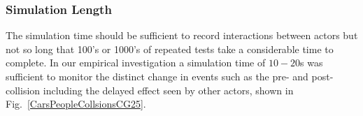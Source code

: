 \documentclass[letterpaper, 10 pt, journal, twoside]{IEEEtran}
\begin{document}






\subsubsection{Simulation Length} 
The simulation time should be sufficient to record interactions between actors but not so long that 100's or 1000's of repeated tests take a considerable time to complete. In our empirical investigation a simulation time of $10-20$s was sufficient to monitor the distinct change in events such as the pre- and post-collision including the delayed effect seen by other actors, shown in Fig.~\ref{CarsPeopleCollsionsCG25}.

\end{document}
